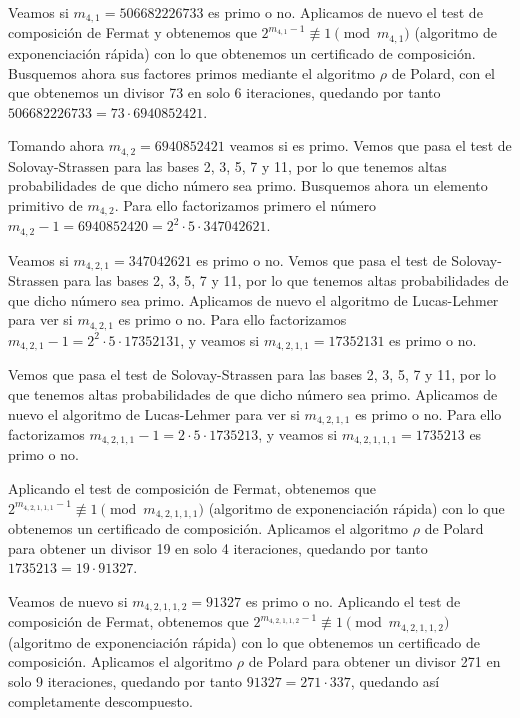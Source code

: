 \documentclass[fleqn]{article}
\begin{document}
    Veamos si $m_{4,1} = 506682226733$ es primo o no.
    Aplicamos de nuevo el test de composición de Fermat y obtenemos que $2^{m_{4,1} -1} \not\equiv 1 \pmod{m_{4,1}}$ (algoritmo de exponenciación rápida) 
    con lo que obtenemos un certificado de composición. Busquemos ahora sus factores primos mediante el algoritmo $\rho$ de Polard, con el que 
    obtenemos un divisor 73 en solo 6 iteraciones, quedando por tanto $506682226733 = 73 \cdot 6940852421$. 
    
    Tomando ahora $m_{4,2} = 6940852421$
    veamos si es primo. Vemos que pasa el test de Solovay-Strassen para las bases 2, 3, 5, 7 y 11, por lo que tenemos altas probabilidades de que dicho número sea primo.
    Busquemos ahora un elemento primitivo de $m_{4,2}$. Para ello factorizamos primero el número $m_{4,2} - 1 = 6940852420 = 2^2 \cdot 5 \cdot 347042621$.
    
    Veamos si $m_{4,2,1} = 347042621$ es primo o no. Vemos que pasa el test de Solovay-Strassen para las bases 2, 3, 5, 7 y 11, por lo que tenemos altas 
    probabilidades de que dicho número sea primo. Aplicamos de nuevo el algoritmo de Lucas-Lehmer para ver si $m_{4,2,1}$ es primo o no. Para ello
    factorizamos $m_{4,2,1} - 1 =  2^2 \cdot 5 \cdot 17352131$, y veamos si $m_{4,2,1,1} = 17352131$ es primo o no. 
    
    Vemos que pasa el test de Solovay-Strassen
    para las bases 2, 3, 5, 7 y 11, por lo que tenemos altas probabilidades de que dicho número sea primo. Aplicamos de nuevo el algoritmo de Lucas-Lehmer
    para ver si $m_{4,2,1,1}$ es primo o no. Para ello factorizamos $m_{4,2,1,1} - 1 =  2 \cdot 5 \cdot 1735213$, y veamos si $m_{4,2,1,1,1} = 1735213$
    es primo o no. 

    Aplicando el test de composición de Fermat, obtenemos que $2^{m_{4,2,1,1,1} -1} \not\equiv 1 \pmod{m_{4,2,1,1,1}}$ (algoritmo de exponenciación rápida)
    con lo que obtenemos un certificado de composición. Aplicamos el algoritmo $\rho$ de Polard para obtener un divisor 19 en solo 4 iteraciones, quedando por tanto
    $1735213 = 19 \cdot 91327$. 
    
    Veamos de nuevo si $m_{4,2,1,1,2} = 91327$ es primo o no. Aplicando el test de composición de Fermat, obtenemos que
    $2^{m_{4,2,1,1,2} -1} \not\equiv 1 \pmod{m_{4,2,1,1,2}}$ (algoritmo de exponenciación rápida) con lo que obtenemos un certificado de composición.
    Aplicamos el algoritmo $\rho$ de Polard para obtener un divisor 271 en solo 9 iteraciones, quedando por tanto $91327 = 271 \cdot 337$, quedando así completamente 
    descompuesto.\\ 
    
\end{document}

